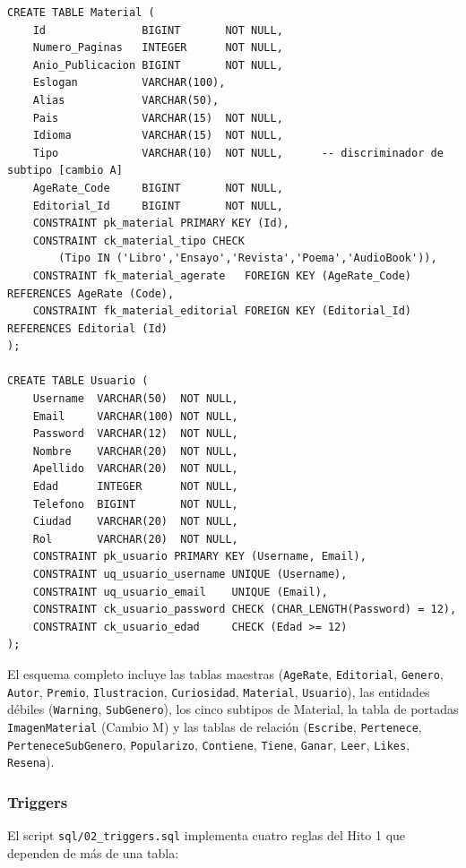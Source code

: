 \documentclass[12pt,a4paper]{article}
\begin{document}
\begin{lstlisting}
CREATE TABLE Material (
    Id               BIGINT       NOT NULL,
    Numero_Paginas   INTEGER      NOT NULL,
    Anio_Publicacion BIGINT       NOT NULL,
    Eslogan          VARCHAR(100),
    Alias            VARCHAR(50),
    Pais             VARCHAR(15)  NOT NULL,
    Idioma           VARCHAR(15)  NOT NULL,
    Tipo             VARCHAR(10)  NOT NULL,      -- discriminador de subtipo [cambio A]
    AgeRate_Code     BIGINT       NOT NULL,
    Editorial_Id     BIGINT       NOT NULL,
    CONSTRAINT pk_material PRIMARY KEY (Id),
    CONSTRAINT ck_material_tipo CHECK
        (Tipo IN ('Libro','Ensayo','Revista','Poema','AudioBook')),
    CONSTRAINT fk_material_agerate   FOREIGN KEY (AgeRate_Code)  REFERENCES AgeRate (Code),
    CONSTRAINT fk_material_editorial FOREIGN KEY (Editorial_Id) REFERENCES Editorial (Id)
);

CREATE TABLE Usuario (
    Username  VARCHAR(50)  NOT NULL,
    Email     VARCHAR(100) NOT NULL,
    Password  VARCHAR(12)  NOT NULL,
    Nombre    VARCHAR(20)  NOT NULL,
    Apellido  VARCHAR(20)  NOT NULL,
    Edad      INTEGER      NOT NULL,
    Telefono  BIGINT       NOT NULL,
    Ciudad    VARCHAR(20)  NOT NULL,
    Rol       VARCHAR(20)  NOT NULL,
    CONSTRAINT pk_usuario PRIMARY KEY (Username, Email),
    CONSTRAINT uq_usuario_username UNIQUE (Username),
    CONSTRAINT uq_usuario_email    UNIQUE (Email),
    CONSTRAINT ck_usuario_password CHECK (CHAR_LENGTH(Password) = 12),
    CONSTRAINT ck_usuario_edad     CHECK (Edad >= 12)
);
\end{lstlisting}

El esquema completo incluye las tablas maestras (\texttt{AgeRate},
\texttt{Editorial}, \texttt{Genero}, \texttt{Autor}, \texttt{Premio},
\texttt{Ilustracion}, \texttt{Curiosidad}, \texttt{Material},
\texttt{Usuario}), las entidades débiles (\texttt{Warning},
\texttt{SubGenero}), los cinco subtipos de Material, la tabla de portadas
\texttt{ImagenMaterial} (Cambio M) y las tablas de relación
(\texttt{Escribe}, \texttt{Pertenece}, \texttt{PerteneceSubGenero},
\texttt{Popularizo}, \texttt{Contiene}, \texttt{Tiene}, \texttt{Ganar},
\texttt{Leer}, \texttt{Likes}, \texttt{Resena}).

\subsubsection{Triggers}
\label{sec:triggers}

El script \texttt{sql/02\_triggers.sql} implementa cuatro reglas del Hito 1 que
dependen de más de una tabla:
\end{document}
